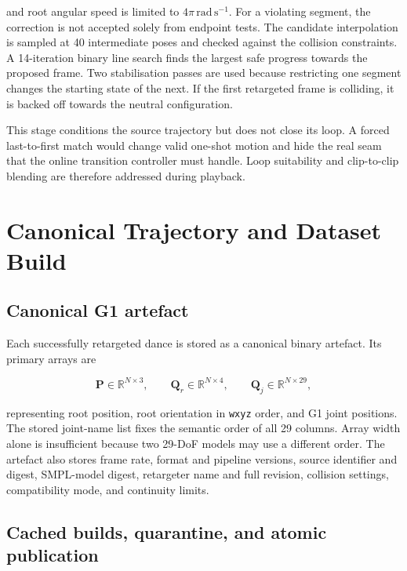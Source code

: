 and root angular speed is limited to $4\pi\,\mathrm{rad\,s^{-1}}$. For a
violating segment, the correction is not accepted solely from endpoint tests.
The candidate interpolation is sampled at 40 intermediate poses and checked
against the collision constraints. A 14-iteration binary line search finds the
largest safe progress towards the proposed frame. Two stabilisation passes are
used because restricting one segment changes the starting state of the next.
If the first retargeted frame is colliding, it is backed off towards the neutral
configuration.

This stage conditions the source trajectory but does not close its loop. A
forced last-to-first match would change valid one-shot motion and hide the real
seam that the online transition controller must handle. Loop suitability and
clip-to-clip blending are therefore addressed during playback.

\section{Canonical Trajectory and Dataset Build}
\label{sec:canonical_dataset}

\subsection{Canonical G1 artefact}
\label{subsec:canonical_artifact}

Each successfully retargeted dance is stored as a canonical binary artefact.
Its primary arrays are

\begin{equation}
    \mathbf{P}\in\mathbb{R}^{N\times3},\qquad
    \mathbf{Q}_{r}\in\mathbb{R}^{N\times4},\qquad
    \mathbf{Q}_{j}\in\mathbb{R}^{N\times29},
    \label{eq:canonical_motion_arrays}
\end{equation}

representing root position, root orientation in \texttt{wxyz} order, and G1
joint positions. The stored joint-name list fixes the semantic order of all 29
columns. Array width alone is insufficient because two 29-DoF models may use a
different order. The artefact also stores frame rate, format and pipeline
versions, source identifier and digest, SMPL-model digest, retargeter name and
full revision, collision settings, compatibility mode, and continuity limits.


\subsection{Cached builds, quarantine, and atomic publication}
\label{subsec:dataset_build_management}

